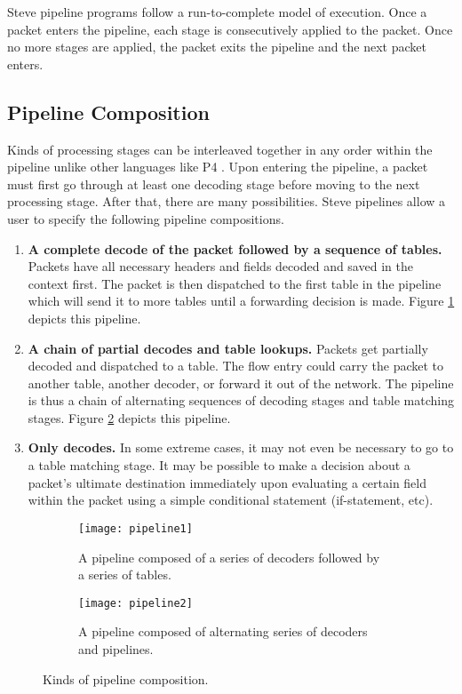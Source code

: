 Steve pipeline programs follow a run-to-complete model of execution. Once a
packet enters the pipeline, each stage is consecutively applied to
the packet. Once no more stages are applied, the packet exits the pipeline and
the next packet enters.

\subsection{Pipeline Composition} \label{pipeline_comp_desc}

Kinds of processing stages can be interleaved together in any order within the
pipeline unlike other languages like P4 \cite{p42014, p4_spec}. 
Upon entering the pipeline, a packet must first go through at least one decoding
stage before moving to the next processing stage. After that, there are many
possibilities.
Steve pipelines allow a user to specify the following pipeline compositions.

\begin{enumerate} 
\item \textbf{A complete decode of the packet followed by a
sequence of tables.} Packets have all necessary headers and fields decoded and
saved in the context first. The packet is then dispatched to the first table in
the pipeline which will send it to more tables until a forwarding decision is made.
Figure \ref{fg:pipeline1} depicts this pipeline.

\item \textbf{A chain of partial decodes and table lookups.} Packets get
partially decoded and dispatched to a table. The flow entry could carry the
packet to another table, another decoder, or forward it out of the network. The
pipeline is thus a chain of alternating sequences of decoding stages and table
matching stages. 
Figure \ref{fg:pipeline2} depicts this pipeline.

\item \textbf{Only decodes.} In some extreme cases, it may not
even be necessary to go to a table matching stage. It may be possible to make a
decision about a packet’s ultimate destination immediately upon evaluating a
certain field within the packet using a simple conditional statement
(if-statement, etc).
\end{enumerate}

\begin{figure}[ht]
\begin{subfigure}[t]{\linewidth}
  \centering
  \texttt{[image: pipeline1]}
  \caption{A pipeline composed of a series of decoders followed by a series
  of tables.}
  \label{fg:pipeline1}
\end{subfigure}
\hfill
\begin{subfigure}[t]{0.95\linewidth}
  \centering
  \texttt{[image: pipeline2]}
  \caption{A pipeline composed of alternating series of decoders and pipelines.}
  \label{fg:pipeline2}
\end{subfigure}

\caption{Kinds of pipeline composition.}
\label{fg:pipeline_comp}
\end{figure}

